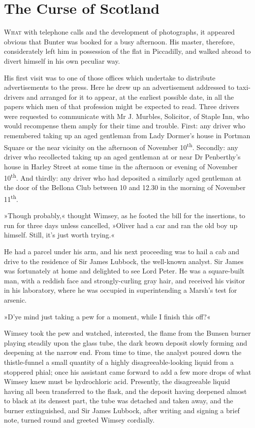 \chapter{The Curse of Scotland}

\lettrine[lines=4]{W}{hat} with telephone calls and the development of photographs, it appeared obvious that Bunter was booked for a busy afternoon. His master, therefore, considerately left him in possession of the flat in Piccadilly, and walked abroad to divert himself in his own peculiar way.

His first visit was to one of those offices which undertake to distribute advertisements to the press. Here he drew up an advertisement addressed to taxi-drivers and arranged for it to appear, at the earliest possible date, in all the papers which men of that profession might be expected to read. Three drivers were requested to communicate with Mr J. Murbles, Solicitor, of Staple Inn, who would recompense them amply for their time and trouble. First: any driver who remembered taking up an aged gentleman from Lady Dormer's house in Portman Square or the near vicinity on the afternoon of November  10\textsuperscript{th}. Secondly: any driver who recollected taking up an aged gentleman at or near Dr Penberthy's house in Harley Street at some time in the afternoon or evening of November  10\textsuperscript{th}. And thirdly: any driver who had deposited a similarly aged gentleman at the door of the Bellona Club between 10 and 12.30 in the morning of November  11\textsuperscript{th}.

»Though probably,« thought Wimsey, as he footed the bill for the insertions, to run for three days unless cancelled, »Oliver had a car and ran the old boy up himself. Still, it's just worth trying.«

He had a parcel under his arm, and his next proceeding was to hail a cab and drive to the residence of Sir James Lubbock, the well-known analyst. Sir James was fortunately at home and delighted to see Lord Peter. He was a square-built man, with a reddish face and strongly-curling gray hair, and received his visitor in his laboratory, where he was occupied in superintending a Marsh's test for arsenic.

»D'ye mind just taking a pew for a moment, while I finish this off?«

Wimsey took the pew and watched, interested, the flame from the Bunsen burner playing steadily upon the glass tube, the dark brown deposit slowly forming and deepening at the narrow end. From time to time, the analyst poured down the thistle-funnel a small quantity of a highly disagreeable-looking liquid from a stoppered phial; once his assistant came forward to add a few more drops of what Wimsey knew must be hydrochloric acid. Presently, the disagreeable liquid having all been transferred to the flask, and the deposit having deepened almost to black at its densest part, the tube was detached and taken away, and the burner extinguished, and Sir James Lubbock, after writing and signing a brief note, turned round and greeted Wimsey cordially.

